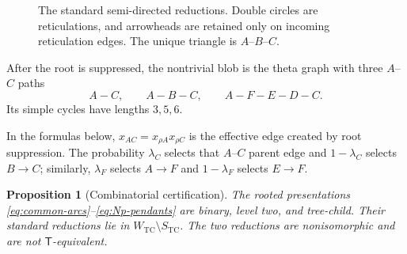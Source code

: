 \documentclass[11pt]{article}
\newtheorem{proposition}[theorem]{Proposition}
\theoremstyle{remark}
\newcommand{\TCw}{W_{\mathrm{TC}}}
\newcommand{\TCs}{S_{\mathrm{TC}}}
\newcommand{\Tmove}{\mathsf T}
\begin{document}
\begin{figure}[ht]
\centering
{}
\caption{The standard semi-directed reductions.  Double circles are
reticulations, and arrowheads are retained only on incoming reticulation
edges.  The unique triangle is $A$--$B$--$C$.}
\label{fig:pair}
\end{figure}

After the root is suppressed, the nontrivial blob is the theta graph with
three $A$--$C$ paths
\[
A-C,\qquad A-B-C,\qquad A-F-E-D-C.
\]
Its simple cycles have lengths $3,5,6$.

In the formulas below, $x_{AC}=x_{\rho A}x_{\rho C}$ is the effective edge
created by root suppression.  The probability $\lambda_C$ selects that
$A$--$C$ parent edge and $1-\lambda_C$ selects $B\to C$; similarly,
$\lambda_F$ selects $A\to F$ and $1-\lambda_F$ selects $E\to F$.

\begin{proposition}[Combinatorial certification]\label{prop:topology}
The rooted presentations \eqref{eq:common-arcs}--\eqref{eq:Np-pendants}
are binary, level two, and tree-child.  Their standard reductions lie in
$\TCw\setminus\TCs$.  The two reductions are nonisomorphic and are not
$\Tmove$-equivalent.
\end{proposition}
\end{document}
